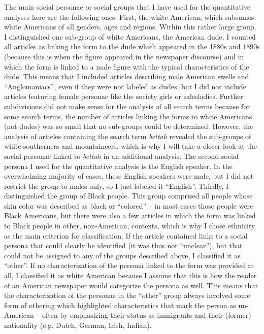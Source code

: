 The main social personae or social groups that I have used for the quantitative analyses here are the following ones: First, the white American, which subsumes white Americans of all genders, ages and regions. Within this rather large group, I distinguished one sub-group of white Americans, the American dude. I counted all articles as linking the form to the dude which appeared in the 1880s and 1890s (because this is when the figure appeared in the newspaper discourse) and in which the form is linked to a male figure with the typical characteristics of the dude. This means that I included articles describing male American swells and “Anglomaniacs”, even if they were not labeled as dudes, but I did not include articles featuring female personae like the society girls or salesladies. Further subdivisions did not make sense for the analysis of all search terms because for some search terms, the number of articles linking the forms to white Americans (not dudes) was so small that no sub-groups could be determined. However, the analysis of articles containing the search term \emph{bettah} revealed the sub-groups of white southerners and mountaineers, which is why I will take a closer look at the social personae linked to \emph{bettah} in an additional analysis. The second social persona I used for the quantitative analysis is the English speaker. In the overwhelming majority of cases, these English speakers were male, but I did not restrict the group to males only, so I just labeled it “English”. Thirdly, I distinguished the group of Black people. This group comprised all people whose skin color was described as black or “colored” – in most cases those people were Black Americans, but there were also a few articles in which the form was linked to Black people in other, non-American, contexts, which is why I chose ethnicity as the main criterion for classification. If the article contained links to a social persona that could clearly be identified (it was thus not “unclear”), but that could not be assigned to any of the groups described above, I classified it as “other”. If no characterization of the persona linked to the form was provided at all, I classified it as white American because I assume that this is how the reader of an American newspaper would categorize the persona as well. This means that the characterization of the personae in the “other” group always involved some form of othering which highlighted characteristics that mark the person as un-American – often by emphasizing their status as immigrants and their (former) nationality (e.g. Dutch, German, Irish, Indian).

